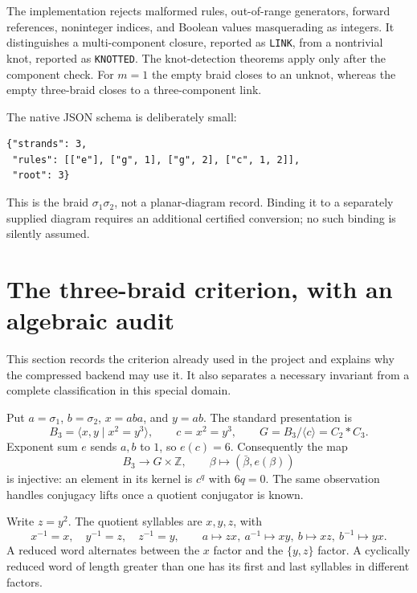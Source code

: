 \documentclass[11pt,letterpaper]{article}
\theoremstyle{definition}\newtheorem{definition}[theorem]{Definition}
\theoremstyle{remark}\newtheorem{remark}[theorem]{Remark}
\newcommand{\Z}{\mathbb Z}\newcommand{\F}{\mathbb F}
\begin{document}
The implementation rejects malformed rules, out-of-range generators, forward references, noninteger indices, and Boolean values masquerading as integers. It distinguishes a multi-component closure, reported as \texttt{LINK}, from a nontrivial knot, reported as \texttt{KNOTTED}. The knot-detection theorems apply only after the component check. For $m=1$ the empty braid closes to an unknot, whereas the empty three-braid closes to a three-component link.

The native JSON schema is deliberately small:
\begin{lstlisting}
{"strands": 3,
 "rules": [["e"], ["g", 1], ["g", 2], ["c", 1, 2]],
 "root": 3}
\end{lstlisting}
This is the braid $\sigma_1\sigma_2$, not a planar-diagram record. Binding it to a separately supplied diagram requires an additional certified conversion; no such binding is silently assumed.

\section{The three-braid criterion, with an algebraic audit}
This section records the criterion already used in the project and explains why the compressed backend may use it. It also separates a necessary invariant from a complete classification in this special domain.

Put $a=\sigma_1$, $b=\sigma_2$, $x=aba$, and $y=ab$. The standard presentation is
\[
 B_3=\langle x,y\mid x^2=y^3\rangle,
 \qquad c=x^2=y^3,
 \qquad G=B_3/\langle c\rangle=C_2*C_3.
\]
Exponent sum $e$ sends $a,b$ to $1$, so $e(c)=6$. Consequently the map
\[
 B_3\longrightarrow G\times\Z,\qquad \beta\longmapsto(\bar\beta,e(\beta))
\]
is injective: an element in its kernel is $c^q$ with $6q=0$. The same observation handles conjugacy lifts once a quotient conjugator is known.

Write $z=y^2$. The quotient syllables are $x,y,z$, with
\[
 x^{-1}=x,\quad y^{-1}=z,\quad z^{-1}=y,
 \qquad
 a\mapsto zx,\ a^{-1}\mapsto xy,\ b\mapsto xz,\ b^{-1}\mapsto yx.
\]
A reduced word alternates between the $x$ factor and the $\{y,z\}$ factor. A cyclically reduced word of length greater than one has its first and last syllables in different factors.
\end{document}
